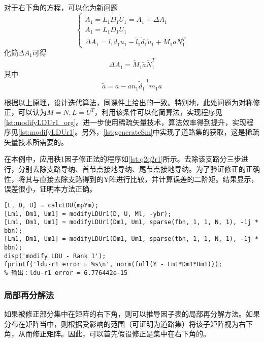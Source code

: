 \documentclass[a4paper,12pt]{article}
\begin{document}
    对于右下角的方程，可以化为新问题
    \begin{equation}
      \left\{
        \begin{array}{l}
          \widetilde A_1 = \widetilde L_1 \widetilde D_1 \widetilde U_1 = A_1 + \Delta A_1 \\
          A_1 = L_1 D_1 U_1\\
          \Delta A_1 = l_1d_1u_1-\widetilde l_1 \widetilde d_1 \widetilde u_1 + M_1aN_1^T
        \end{array}
      \right.
    \end{equation}
    化简$\Delta A_1$可得
    \begin{equation}
      \Delta A_1=\widetilde M_1 \widetilde a \widetilde N_1^T
    \end{equation}
    其中
    \begin{equation}
      \widetilde a=a-an_1\widetilde d_1^{-1}m_1a
    \end{equation}

    根据以上原理，设计迭代算法，同课件上给出的一致。特别地，此处问题为对称修正，可以认为$M=N, L=U^T$，利用该条件可以化简算法，实现程序见\cref{lst:modifyLDUr1_org}。进一步使用稀疏矢量技术，算法效率得到提升，实现程序见\cref{lst:modifyLDUr1}。另外，\cref{lst:generateSm}中实现了道路集的获取，这是稀疏矢量技术所需要的。

    在本例中，应用秩1因子修正法的程序如\cref{lst:q2q2r1}所示。去除该支路分三步进行，分别去除支路导纳、首节点接地导纳、尾节点接地导纳。为了验证修正的正确性，将其与直接去除支路得到的Y阵进行比较，并计算误差的二阶矩。结果显示，误差很小，证明本方法正确。
    \begin{lstlisting}[style=Matlab-editor,basicstyle=\mlttfamily,caption={秩1因子修正法去除支路},label=lst:q2q2r1]
[L, D, U] = calcLDU(mpYm);
[Lm1, Dm1, Um1] = modifyLDUr1(D, U, Ml, -ybr);
[Lm1, Dm1, Um1] = modifyLDUr1(Dm1, Um1, sparse(fbn, 1, 1, N, 1), -1j * bbn);
[Lm1, Dm1, Um1] = modifyLDUr1(Dm1, Um1, sparse(tbn, 1, 1, N, 1), -1j * bbn);
disp('modify LDU - Rank 1');
fprintf('ldu-r1 error = %s\n', norm(full(Y - Lm1*Dm1*Um1)));
% 输出：ldu-r1 error = 6.776442e-15
    \end{lstlisting}
    \subsubsection{局部再分解法}
    如果被修正部分集中在矩阵的右下角，则可以推导因子表的局部再分解方法。如果分布在矩阵当中，则根据受影响的范围（可证明为道路集）将该子矩阵视为右下角，从而修正矩阵。因此，可以首先假设修正是集中在右下角的。
\end{document}
